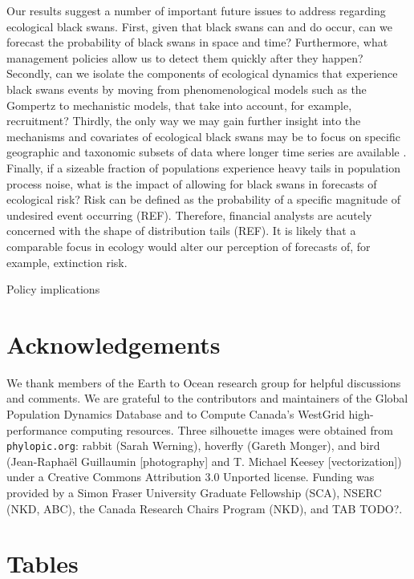 Our results suggest a number of important future issues to address regarding ecological black swans. First, given that black swans can and do occur, can we forecast the probability of black swans in space and time? Furthermore, what management policies allow us to detect them quickly after they happen? Secondly, can we isolate the components of ecological dynamics that experience black swans events by moving from phenomenological models such as the Gompertz to mechanistic models, that take into account, for example, recruitment? Thirdly, the only way we may gain further insight into the mechanisms and covariates of ecological black swans may be to focus on specific geographic and taxonomic subsets of data where longer time series are available \citep[e.g.][]{segura2013}. Finally, if a sizeable fraction of populations experience heavy tails in population process noise, what is the impact of allowing for black swans in forecasts of ecological risk? Risk can be defined as the probability of a specific magnitude of undesired event occurring (REF). Therefore, financial analysts are acutely concerned with the shape of distribution tails (REF). It is likely that a comparable focus in ecology would alter our perception of forecasts of, for example, extinction risk.

Policy implications

\section{Acknowledgements}

We thank members of the Earth to Ocean research group for helpful discussions and comments. We are grateful to the contributors and maintainers of the Global Population Dynamics Database and to Compute Canada's WestGrid high-performance computing resources. Three silhouette images were obtained from \texttt{phylopic.org}: rabbit (Sarah Werning), hoverfly (Gareth Monger), and bird (Jean-Raphaël Guillaumin {[}photography{]} and T. Michael Keesey {[}vectorization{]}) under a Creative Commons Attribution 3.0 Unported license. Funding was provided by a Simon Fraser University Graduate Fellowship (SCA), NSERC (NKD, ABC), the Canada Research Chairs Program (NKD), and TAB TODO?.




\clearpage

\section{Tables}

